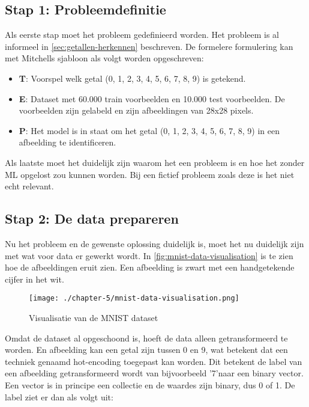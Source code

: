 \subsection{Stap 1: Probleemdefinitie}\label{subsec:stap-1-probleemdefinitie}
Als eerste stap moet het probleem gedefinieerd worden. Het probleem is al informeel in \autoref{sec:getallen-herkennen} beschreven. De formelere formulering kan met Mitchells sjabloon als volgt worden opgeschreven:

\begin{itemize}
  \item \textbf{T}: Voorspel welk getal (0, 1, 2, 3, 4, 5, 6, 7, 8, 9) is getekend.
  \item \textbf{E}: Dataset met 60.000 train voorbeelden en 10.000 test voorbeelden. De voorbeelden zijn gelabeld en zijn afbeeldingen van 28x28 pixels.
  \item \textbf{P}: Het model is in staat om het getal (0, 1, 2, 3, 4, 5, 6, 7, 8, 9) in een afbeelding te identificeren.
\end{itemize}

Als laatste moet het duidelijk zijn waarom het een probleem is en hoe het zonder ML opgelost zou kunnen worden. Bij een fictief probleem zoals deze is het niet echt relevant.

\subsection{Stap 2: De data prepareren}\label{subsec:de-data-prepareren}
Nu het probleem en de gewenste oplossing duidelijk is, moet het nu duidelijk zijn met wat voor data er gewerkt wordt. In \autoref{fig:mnist-data-visualisation} is te zien hoe de afbeeldingen eruit zien. Een afbeelding is zwart met een handgetekende cijfer in het wit.

\begin{figure}[hbt!]
  \centering
  \texttt{[image: ./chapter-5/mnist-data-visualisation.png]}
  \caption{Visualisatie van de MNIST dataset}
  \label{fig:mnist-data-visualisation}
\end{figure}

Omdat de dataset al opgeschoond is, hoeft de data alleen getransformeerd te worden. En afbeelding kan een getal zijn tussen 0 en 9, wat betekent dat een techniek genaamd \gls{hot-encoding} toegepast kan worden. Dit betekent de label van een afbeelding getransformeerd wordt van bijvoorbeeld '7'\space naar een binary vector. Een vector is in principe een collectie en de waardes zijn binary, dus 0 of 1. De label ziet er dan als volgt uit:

